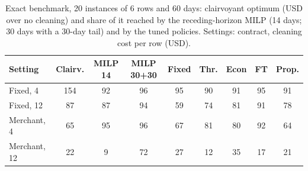 \begin{table}[!t]
\centering
\caption{Exact benchmark, 20 instances of 6 rows and 60 days: clairvoyant optimum (USD over no cleaning) and share of it reached by the receding-horizon MILP (14 days; 30 days with a 30-day tail) and by the tuned policies. Settings: contract, cleaning cost per row (USD).}
\label{tab:exact}
\scriptsize
\setlength{\tabcolsep}{2.3pt}
\begin{tabular}{lcccccccc}
\toprule
Setting & Clairv. & MILP 14 & MILP 30+30 & Fixed & Thr. & Econ & FT & Prop. \\
\midrule
Fixed, 4 & 154 & 92 & 96 & 95 & 90 & 91 & 95 & 91 \\
Fixed, 12 & 87 & 87 & 94 & 59 & 74 & 81 & 91 & 78 \\
Merchant, 4 & 65 & 95 & 96 & 67 & 81 & 80 & 92 & 64 \\
Merchant, 12 & 22 & 9 & 72 & 27 & 12 & 35 & 17 & 21 \\
\bottomrule
\end{tabular}
\end{table}
